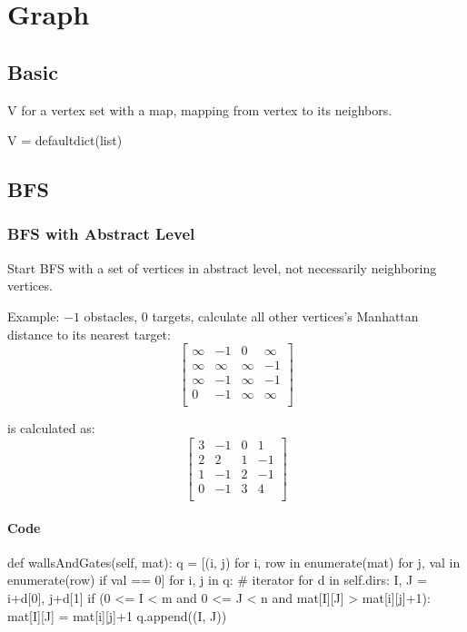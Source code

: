 \chapter{Graph}

\section{Basic}
 V for a vertex set with a map, mapping from vertex to its neighbors.
\begin{python}
V = defaultdict(list)
\end{python}

\section{BFS}
\subsection{BFS with Abstract Level}
Start BFS with a set of vertices in abstract level, not necessarily neighboring vertices.

Example:
$-1$ obstacles, $0$ targets, calculate all other vertices's Manhattan distance to its nearest target:
$$
\begin{bmatrix}
\infty & -1 & 0 & \infty \\
\infty & \infty & \infty & -1 \\
\infty & -1 & \infty & -1 \\
0 & -1 & \infty & \infty \\
\end{bmatrix} 
$$

is calculated as:
$$
\begin{bmatrix}
3 & -1 & 0 & 1 \\
2 & 2 & 1 & -1 \\
1 & -1 & 2 & -1 \\
0 & -1 & 3 & 4 \\
\end{bmatrix}
$$

\subsubsection*{Code}
\begin{python}
def wallsAndGates(self, mat):
    q = [(i, j) for i, row in enumerate(mat) 
         for j, val in enumerate(row) if val == 0]
    for i, j in q:  # iterator
        for d in self.dirs:
            I, J = i+d[0], j+d[1]
            if (0 <= I < m and  0 <= J < n and 
                mat[I][J] > mat[i][j]+1):
                mat[I][J] = mat[i][j]+1
                q.append((I, J))
\end{python}



